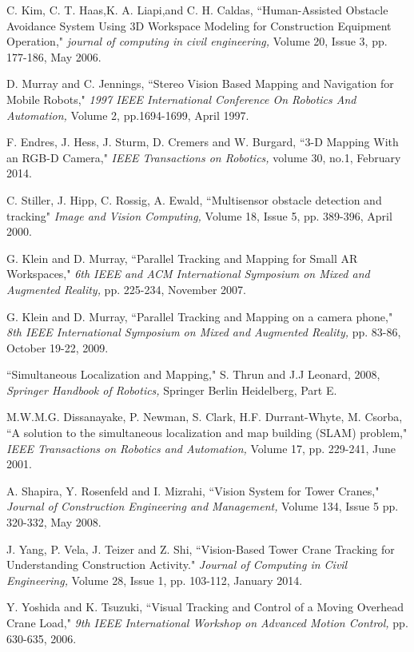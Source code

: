 \documentclass[twocolumn,10pt]{asme2e}
\begin{document}
\begin{thebibliography}{9}
C. Kim, C. T. Haas,K. A. Liapi,and C. H. Caldas,
``Human-Assisted Obstacle Avoidance System Using 3D Workspace Modeling for Construction Equipment Operation,"
{\em journal of computing in civil engineering,}
Volume 20, Issue 3, pp. 177-186, May 2006.

D. Murray and C. Jennings,
``Stereo Vision Based Mapping and Navigation for Mobile Robots,"
{\em 1997 IEEE International Conference On Robotics And Automation,}
Volume 2, pp.1694-1699, April 1997.

F. Endres, J. Hess, J. Sturm, D. Cremers and W. Burgard,
``3-D Mapping With an RGB-D Camera,"
{\em IEEE Transactions on Robotics,}
volume 30, no.1, February 2014.

C. Stiller, J. Hipp, C. Rossig, A. Ewald,
``Multisensor obstacle detection and tracking"
{\em Image and Vision Computing,}
Volume 18, Issue 5, pp. 389-396, April 2000.

G. Klein and D. Murray,
``Parallel Tracking and Mapping for Small AR Workspaces,"
{\em 6th IEEE and ACM International Symposium on Mixed and Augmented Reality,}
pp. 225-234, November 2007.

G. Klein and D. Murray,
``Parallel Tracking and Mapping on a camera phone,"
{\em 8th IEEE International Symposium on Mixed and Augmented Reality,}
pp. 83-86, October 19-22, 2009.

``Simultaneous Localization and Mapping,"
S. Thrun and J.J Leonard,  2008,
{\em Springer Handbook of Robotics,}
Springer Berlin Heidelberg, Part E.

M.W.M.G. Dissanayake, P. Newman, S. Clark,  H.F. Durrant-Whyte,  M. Csorba,
``A solution to the simultaneous localization and map building (SLAM) problem,"
{\em IEEE Transactions on Robotics and Automation,}
Volume 17, pp. 229-241, June 2001.

A. Shapira, Y. Rosenfeld and I. Mizrahi,
``Vision System for Tower Cranes,"
{\em Journal of Construction Engineering and Management,}
Volume 134, Issue 5 pp. 320-332, May 2008.

J. Yang, P. Vela, J. Teizer and  Z. Shi,
``Vision-Based Tower Crane Tracking for Understanding Construction Activity."
{\em Journal of Computing in Civil Engineering,}
Volume 28, Issue 1, pp. 103-112, January 2014.

Y. Yoshida and K. Tsuzuki,
``Visual Tracking and Control of a Moving Overhead Crane Load,"
{\em 9th IEEE International Workshop on Advanced Motion Control,}
pp. 630-635, 2006.

\end{thebibliography}
\end{document}
